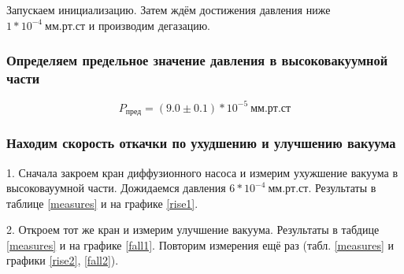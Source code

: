 \documentclass[a4paper, 12pt]{article}
\begin{document}
            Запускаем инициализацию. Затем ждём достижения давления ниже $ 1*10^{-4}~мм.рт.ст$ и производим дегазацию.

        \subsubsection{Определяем предельное значение давления в высоковакуумной части}

            $$ P_{пред} = (9.0 \pm 0.1)*10^{-5}~мм.рт.ст $$

        \subsubsection{Находим скорость откачки по ухудшению и улучшению вакуума}

            1. Сначала закроем кран диффузионного насоса и измерим ухужшение вакуума в высоковауумной части. Дожидаемся давления $6*10^{-4}~мм.рт.ст$. Результаты в таблице \ref{measures} и на графике \ref{rise1}.

            2. Откроем тот же кран и измерим улучшение вакуума. Результаты в табдице \ref{measures} и на графике \ref{fall1}. Повторим измерения ещё раз (табл. \ref{measures} и графики \ref{rise2}, \ref{fall2}).
\end{document}

